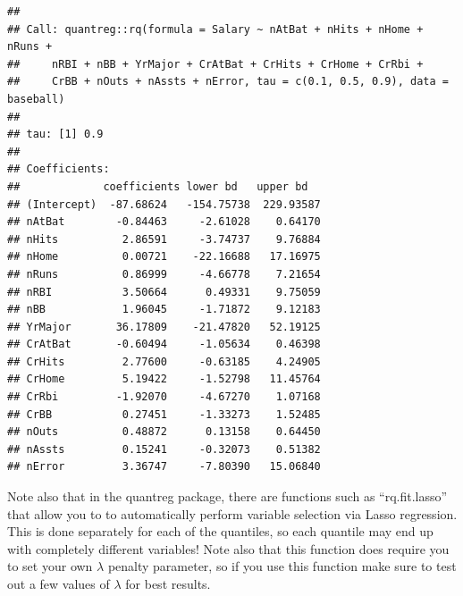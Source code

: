 \documentclass{article}\usepackage[]{graphicx}\usepackage[]{color}
\makeatletter
\newenvironment{kframe}{%
 \def\at@end@of@kframe{}%
 \ifinner\ifhmode%
  \def\at@end@of@kframe{\end{minipage}}%
  \begin{minipage}{\columnwidth}%
 \fi\fi%
 \def\FrameCommand##1{\hskip\@totalleftmargin \hskip-\fboxsep
 \colorbox{shadecolor}{##1}\hskip-\fboxsep
     \hskip-\linewidth \hskip-\@totalleftmargin \hskip\columnwidth}%
 \MakeFramed {\advance\hsize-\width
   \@totalleftmargin\z@ \linewidth\hsize
   \@setminipage}}%
 {\par\unskip\endMakeFramed%
 \at@end@of@kframe}
\newenvironment{knitrout}{}{} %
\makeatother
\begin{document}
\begin{knitrout}
\begin{kframe}
\begin{verbatim}
## 
## Call: quantreg::rq(formula = Salary ~ nAtBat + nHits + nHome + nRuns + 
##     nRBI + nBB + YrMajor + CrAtBat + CrHits + CrHome + CrRbi + 
##     CrBB + nOuts + nAssts + nError, tau = c(0.1, 0.5, 0.9), data = baseball)
## 
## tau: [1] 0.9
## 
## Coefficients:
##             coefficients lower bd   upper bd  
## (Intercept)  -87.68624   -154.75738  229.93587
## nAtBat        -0.84463     -2.61028    0.64170
## nHits          2.86591     -3.74737    9.76884
## nHome          0.00721    -22.16688   17.16975
## nRuns          0.86999     -4.66778    7.21654
## nRBI           3.50664      0.49331    9.75059
## nBB            1.96045     -1.71872    9.12183
## YrMajor       36.17809    -21.47820   52.19125
## CrAtBat       -0.60494     -1.05634    0.46398
## CrHits         2.77600     -0.63185    4.24905
## CrHome         5.19422     -1.52798   11.45764
## CrRbi         -1.92070     -4.67270    1.07168
## CrBB           0.27451     -1.33273    1.52485
## nOuts          0.48872      0.13158    0.64450
## nAssts         0.15241     -0.32073    0.51382
## nError         3.36747     -7.80390   15.06840
\end{verbatim}
\end{kframe}
\end{knitrout}

Note also that in the quantreg package, there are functions such as ``rq.fit.lasso'' that allow you to to automatically perform variable selection via Lasso regression. This is done separately for each of the quantiles, so each quantile may end up with completely different variables! Note also that this function does require you to set your own $\lambda$ penalty parameter, so if you use this function make sure to test out a few values of $\lambda$ for best results.
\end{document}
